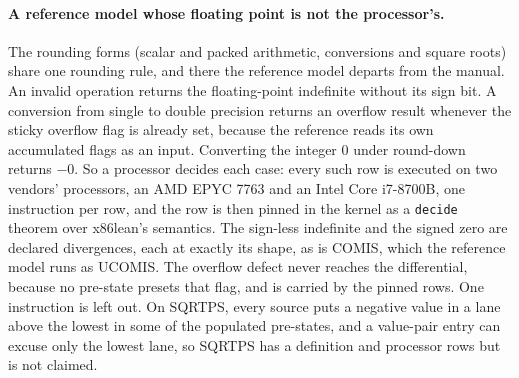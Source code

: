 \documentclass[runningheads]{llncs}
\newcommand{\src}[1]{}  %
\begin{document}
\paragraph{A reference model whose floating point is not the processor's.}
The rounding forms (scalar and packed arithmetic, conversions and square roots) share one rounding
rule, and there the reference model departs from the manual.
An invalid operation returns the floating-point indefinite without its sign bit. A conversion from single
to double precision returns an overflow result whenever the sticky overflow flag is already set, because
the reference reads its own accumulated flags as an input. Converting the integer 0 under round-down
returns $-0$. So a processor decides each case: every such row is executed on two vendors' processors, an
AMD EPYC 7763 and an Intel Core i7-8700B, one instruction per row, and the row
is then pinned in the kernel as a \texttt{decide} theorem over x86lean's semantics. The sign-less
indefinite and the signed zero are declared divergences, each at exactly its shape, as is COMIS, which the reference model runs as UCOMIS. The overflow defect
never reaches the differential, because no pre-state presets that flag, and is carried by the pinned rows.
One instruction is left out. On SQRTPS, every source puts a negative value in a lane above the lowest in
some of the populated pre-states, and a value-pair entry can excuse only the lowest lane, so SQRTPS has a
definition and processor rows but is not claimed.
\src{SDM Vol. 1 4.8.3.7, the QNaN floating-point indefinite carries sign 1 (D265 3, ``The SDM disagrees''; Main.lean's entry source); docs/DECISIONS.md D266 4 (the preset-OE and zero-sign defects, at cvt-spec.lisp), D265 and D284 (rtl::indef,
scalar and packed), D267 10 (the Intel reading beside the AMD runner's), D291 (vsqrt on roundPack); X86/SoftFloat.lean roundPack, and roundsUp, its decision rule, which cvtToInt calls directly, D295 2 (SQRTPS: 15 to 88 of the 88 states per source); D266 and Main.lean knownDivergences comisd\_*/comiss\_* (COMIS run as UCOMIS, field mxcsr.ie);
hwprobe/; Tests/Anchors.lean, the cvtss2sd\_*\_sticky rows marked ``x86isa differs''; Main.lean knownDivergences}
\end{document}
